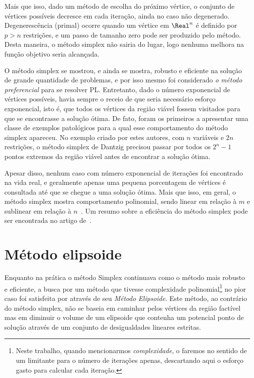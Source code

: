 Mais que isso, dado um método de escolha do próximo vértice, o conjunto de
vértices possíveis decresce em cada iteração,  ainda no caso não degenerado.
Degenerescência (primal) ocorre quando um vértice em $\Real^n$ é definido por
$p>n$ restrições, e um passo de tamanho zero pode ser produzido pelo método. Desta
maneira, o método simplex não sairia do lugar, logo nenhuma melhora na função
objetivo seria alcançada. 


O método simplex se mostrou, e ainda se mostra, robusto e eficiente na solução de grande
quantidade de problemas, e por isso mesmo foi considerado \emph{o método
preferencial} para se resolver \ac{PL}. Entretanto, dado o número exponencial
de  vértices possíveis, havia sempre o receio de que seria necessário esforço
exponencial, isto é, que   todos os vértices da região viável fossem
visitados para que se encontrasse a solução ótima. De fato, \textcite{Klee:1972wi}
foram os primeiros a apresentar uma classe de exemplos patológicos para a qual esse
comportamento  do método simplex apareceu. No exemplo criado por estes
autores, com $n$ variáveis e $2n$ restrições, o método simplex de Dantzig 
precisou passar por todos os $2^n-1$ pontos extremos da região viável antes de
encontrar a solução ótima. 


Apesar disso, nenhum caso com número exponencial de iterações foi encontrado na
vida real, e geralmente apenas uma pequena porcentagem de vértices é
consultada até que se chegue a uma solução ótima. Mais que isso, em geral, o método
simplex mostra comportamento polinomial, sendo linear em relação à $m$ e
sublinear em relação à $n$~\cite[pg.~94]{Fang:1993wu}. Um resumo sobre a
eficiência do método simplex pode ser encontrada no artigo
de~\textcite{Shamir:1987th}.
 

\section{Método elipsoide}

Enquanto na prática o método Simplex continuava como o método mais robusto e
eficiente, a busca por um método que tivesse complexidade polinomial\footnote{Neste trabalho, quando mencionarmos \emph{complexidade}, o faremos no sentido de um limitante para o número de iterações apenas, descartando aqui o esforço gasto para calcular cada iteração.} no pior
caso foi satisfeita por \textcite{Khachiyan:A-polynomial-algorithm:1979y} através
de seu  \emph{Método Elipsoide}.
Este método, ao contrário do método simplex,  não se baseia em caminhar pelos
vértices da região factível mas em diminuir o volume de um elipsoide que
contenha um potencial ponto de solução através de um conjunto de desigualdades
lineares estritas.

